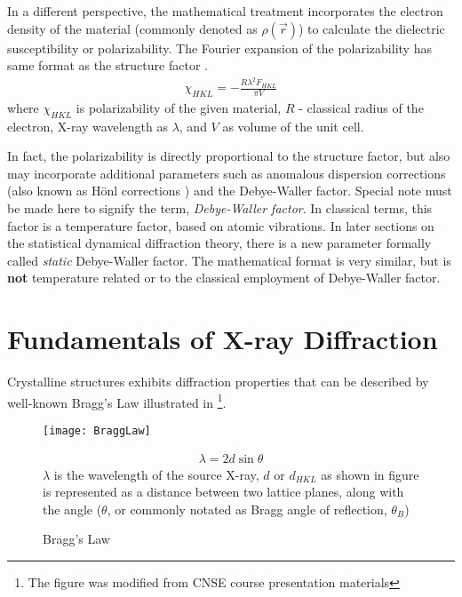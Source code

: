 In a different perspective, the mathematical treatment incorporates the electron density of the material (commonly denoted as $\rho (\vec{r})$) to calculate the dielectric susceptibility or polarizability.  The Fourier expansion of the polarizability has same format as the structure factor \cite{Authier1}.
\begin{align}
\chi_{HKL} = - \frac{R \lambda^2 F_{HKL}}{\pi V}
\end{align}
where $\chi_{HKL}$ is polarizability of the given material, $R$ - classical radius of the electron, X-ray wavelength as $\lambda$, and $V$ as volume of the unit cell.

In fact, the polarizability is directly proportional to the structure factor, but also may incorporate additional parameters such as anomalous dispersion corrections (also known as H\"onl corrections \cite{Batterman1}) and the Debye-Waller factor.  Special note must be made here to signify the term, \emph{Debye-Waller factor}.  In classical terms, this factor is a temperature factor, based on atomic vibrations.  In later sections on the statistical dynamical diffraction theory, there is a new parameter formally called \emph{static} Debye-Waller factor.  The mathematical format is very similar, but is \textbf{not} temperature related or to the classical employment of Debye-Waller factor.

	\section{Fundamentals of X-ray Diffraction}


		Crystalline structures exhibits diffraction properties that can be described by well-known Bragg's Law illustrated in  \footnote{The figure was modified from CNSE course presentation materials}. 
\begin{figure}[h]
\caption{Bragg's Law}
\label{BraggLaw}
\begin{minipage}{\linewidth} 
\centering
\texttt{[image: BraggLaw]}
\end{minipage}
\begin{minipage}{\linewidth}
\begin{align}
\lambda=2d \sin \theta
\end{align}
$\lambda$ is the wavelength of the source X-ray, $d$ or $d_{HKL}$ as shown in figure is represented as a distance between two lattice planes, along with the angle ($\theta$, or commonly notated as Bragg angle of reflection, $\theta_B$)
\end{minipage}
\end{figure}

